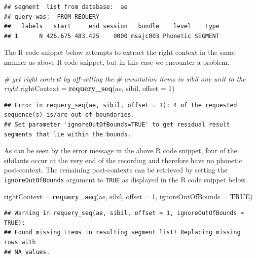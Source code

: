 \documentclass[]{book}
\newenvironment{Shaded}{\begin{snugshade}}{\end{snugshade}}
\newcommand{\CommentTok}[1]{\textcolor[rgb]{0.56,0.35,0.01}{\textit{#1}}}
\newcommand{\DataTypeTok}[1]{\textcolor[rgb]{0.13,0.29,0.53}{#1}}
\newcommand{\DecValTok}[1]{\textcolor[rgb]{0.00,0.00,0.81}{#1}}
\newcommand{\KeywordTok}[1]{\textcolor[rgb]{0.13,0.29,0.53}{\textbf{#1}}}
\newcommand{\NormalTok}[1]{#1}
\newcommand{\OtherTok}[1]{\textcolor[rgb]{0.56,0.35,0.01}{#1}}
\newcommand{\StringTok}[1]{\textcolor[rgb]{0.31,0.60,0.02}{#1}}
\begin{document}
\begin{verbatim}
## segment  list from database:  ae 
## query was:  FROM REQUERY 
##   labels   start     end session   bundle    level    type
## 1      N 426.675 483.425    0000 msajc003 Phonetic SEGMENT
\end{verbatim}

The R code snippet below attempts to extract the right context in the same manner as above R code snippet, but in this case we encounter a problem.

\begin{Shaded}
\begin{Highlighting}[]
\CommentTok{# get right context by off-setting the }
\CommentTok{# annotation items in sibil one unit to the right}
\NormalTok{rightContext =}\StringTok{ }\KeywordTok{requery_seq}\NormalTok{(ae, sibil, }\DataTypeTok{offset =} \DecValTok{1}\NormalTok{)}
\end{Highlighting}
\end{Shaded}

\begin{verbatim}
## Error in requery_seq(ae, sibil, offset = 1): 4 of the requested sequence(s) is/are out of boundaries.
## Set parameter 'ignoreOutOfBounds=TRUE' to get residual result segments that lie within the bounds.
\end{verbatim}

As can be seen by the error message in the above R code snippet, four of the sibilants occur at the very end of the recording and therefore have no phonetic post-context. The remaining post-contexts can be retrieved by setting the \texttt{ignoreOutOfBounds} argument to \texttt{TRUE} as displayed in the R code snippet below.

\begin{Shaded}
\begin{Highlighting}[]
\NormalTok{rightContext =}\StringTok{ }\KeywordTok{requery_seq}\NormalTok{(ae, sibil,}
                           \DataTypeTok{offset =} \DecValTok{1}\NormalTok{,}
                           \DataTypeTok{ignoreOutOfBounds =} \OtherTok{TRUE}\NormalTok{)}
\end{Highlighting}
\end{Shaded}

\begin{verbatim}
## Warning in requery_seq(ae, sibil, offset = 1, ignoreOutOfBounds = TRUE):
## Found missing items in resulting segment list! Replacing missing rows with
## NA values.
\end{verbatim}
\end{document}
